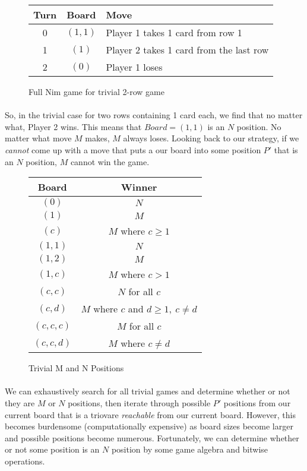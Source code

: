 \documentclass{article}
\begin{document}
\begin{figure}[h]
\centering
\begin{tabular}{|c|c|l|}
\hline
Turn & Board & Move\\
\hline
 0 & $(1,1)$ & Player 1 takes 1 card from row 1\\
 1 & $(1)$ & Player 2 takes 1 card from the last row\\
 2 & $(0)$ & Player 1 loses\\
\hline
\end{tabular}
\caption{Full Nim game for trivial 2-row game}
\end{figure}

\paragraph{}
So, in the trivial case for two rows containing 1 card each, we find that no matter what, Player 2 wins. This means that $Board = (1,1)$ is an $N$ position. No matter what move $M$ makes, $M$ always loses. Looking back to our strategy, if we \textit{cannot} come up with a move that puts a our board into some position $P'$ that is an $N$ position, $M$ cannot win the game.

\begin{figure}[h]
\centering
\begin{tabular}{|c|c|}
\hline
\textbf{Board} & \textbf{Winner}\\
\hline
$(0)$ & $N$\\
\hline
$(1)$ & $M$\\
\hline
$(c)$  & $M$ where $c \ge 1$\\
\hline
$(1,1)$ & $N$\\
\hline
$(1,2)$ & $M$\\
\hline
$(1, c)$ & $M$ where $c > 1$\\
\hline
$(c, c)$ & $N$ for all $c$\\
\hline
$(c, d)$ & $M$ where $c$ and $d \ge 1,\ c \neq d$\\
\hline
$(c,c,c)$ & $M$ for all $c$\\
\hline
$(c,c,d)$ & $M$ where $c \neq d$\\
\hline
\end{tabular}
\caption{Trivial M and N Positions}
\end{figure}

\paragraph{}
We can exhaustively search for all trivial games and determine whether or not they are $M$ or $N$ positions, then iterate through possible $P'$ positions from our current board that is a triovare \textit{reachable} from our current board. However, this becomes burdensome (computationally expensive) as board sizes become larger and possible positions become numerous. Fortunately, we can determine whether or not some position is an $N$ position by some game algebra and bitwise operations.
\end{document}
